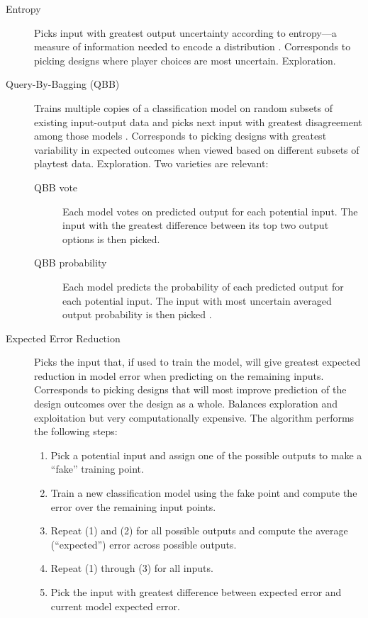 \documentclass{sig-alternate}
\begin{document}
\begin{description}
\item[Entropy] Picks input with greatest output uncertainty according to entropy---a measure of information needed to encode a distribution \cite{settles2012:al-book}.
Corresponds to picking designs where player choices are most uncertain.
Exploration.
%
\item[Query-By-Bagging (QBB)] Trains multiple copies of a classification model on random subsets of existing input-output data and picks next input with greatest disagreement among those models \cite{settles2012:al-book}.
Corresponds to picking designs with greatest variability in expected outcomes when viewed based on different subsets of playtest data.
Exploration.
Two varieties are relevant:
\begin{description}
\item[QBB vote] Each model votes on predicted output for each potential input.
The input with the greatest difference between its top two output options is then picked.
\item[QBB probability] Each model predicts the probability of each predicted output for each potential input.
The input with most uncertain averaged output probability is then picked \cite{abe1998:qbb}.
\end{description}
%
\item[Expected Error Reduction] Picks the input that, if used to train the model, will give greatest expected reduction in model error when predicting on the remaining inputs.
Corresponds to picking designs that will most improve prediction of the design outcomes over the design as a whole.
Balances exploration and exploitation but very computationally expensive.
The algorithm performs the following steps:
\begin{enumerate}
\item Pick a potential input and assign one of the possible outputs to make a ``fake'' training point.
\item Train a new classification model using the fake point and compute the error over the remaining input points.
\item Repeat (1) and (2) for all possible outputs and compute the average (``expected'') error across possible outputs.
\item Repeat (1) through (3) for all inputs.
\item Pick the input with greatest difference between expected error and current model expected error.
\end{enumerate}

\end{description}
\end{document}
